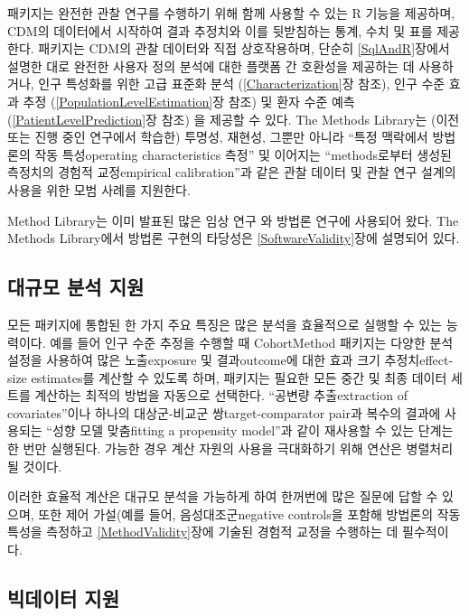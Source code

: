 \documentclass[10.5pt]{book}
\theoremstyle{definition}
\theoremstyle{definition}
\theoremstyle{definition}
\theoremstyle{remark}
\begin{document}
패키지는 완전한 관찰 연구를 수행하기 위해 함께 사용할 수 있는 R 기능을
제공하며, CDM의 데이터에서 시작하여 결과 추정치와 이를 뒷받침하는 통계,
수치 및 표를 제공한다. 패키지는 CDM의 관찰 데이터와 직접 상호작용하며,
단순히 \ref{SqlAndR}장에서 설명한 대로 완전한 사용자 정의 분석에 대한
플랫폼 간 호환성을 제공하는 데 사용하거나, 인구 특성화를 위한 고급
표준화 분석 (\ref{Characterization}장 참조), 인구 수준 효과 추정
(\ref{PopulationLevelEstimation}장 참조) 및 환자 수준 예측
(\ref{PatientLevelPrediction}장 참조) 을 제공할 수 있다. The Methods
Library는 (이전 또는 진행 중인 연구에서 학습한) 투명성, 재현성, 그뿐만
아니라 ``특정 맥락에서 방법론의 작동 특성operating characteristics
측정'' 및 이어지는 ``methods로부터 생성된 측정치의 경험적 교정empirical
calibration''과 같은 관찰 데이터 및 관찰 연구 설계의 사용을 위한 모범
사례를 지원한다.

Method Library는 이미 발표된 많은 임상 연구
\citep{boland_2017, duke_2017, ramcharran_2017, weinstein_2017, wang_2017, ryan_2017, ryan_2018, vashisht_2018, yuan_2018, johnston_2019}와
방법론 연구에 사용되어 왔다.
\citep{schuemie_2014, schuemie_2016, reps2018, tian_2018, schuemie_2018, schuemie_2018b, reps_2019}
The Methods Library에서 방법론 구현의 타당성은
\ref{SoftwareValidity}장에 설명되어 있다.

\subsection{대규모 분석 지원}\label{--}

모든 패키지에 통합된 한 가지 주요 특징은 많은 분석을 효율적으로 실행할
수 있는 능력이다. 예를 들어 인구 수준 추정을 수행할 때 CohortMethod
패키지는 다양한 분석 설정을 사용하여 많은 노출exposure 및 결과outcome에
대한 효과 크기 추정치effect-size estimates를 계산할 수 있도록 하며,
패키지는 필요한 모든 중간 및 최종 데이터 세트를 계산하는 최적의 방법을
자동으로 선택한다. ``공변량 추출extraction of covariates''이나 하나의
대상군-비교군 쌍target-comparator pair과 복수의 결과에 사용되는 ``성향
모델 맞춤fitting a propensity model''과 같이 재사용할 수 있는 단계는 한
번만 실행된다. 가능한 경우 계산 자원의 사용을 극대화하기 위해 연산은
병렬처리 될 것이다.

이러한 효율적 계산은 대규모 분석을 가능하게 하여 한꺼번에 많은 질문에
답할 수 있으며, 또한 제어 가설(예를 들어, 음성대조군negative controls을
포함해 방법론의 작동 특성을 측정하고 \ref{MethodValidity}장에 기술된
경험적 교정을 수행하는 데 필수적이다. 

\subsection{빅데이터 지원}\label{BigDataSupport}
\end{document}
